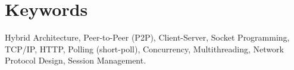 \section*{Keywords}
Hybrid Architecture, Peer-to-Peer (P2P), Client-Server, Socket Programming, TCP/IP, HTTP, Polling (short-poll), Concurrency, Multithreading, Network Protocol Design, Session Management.